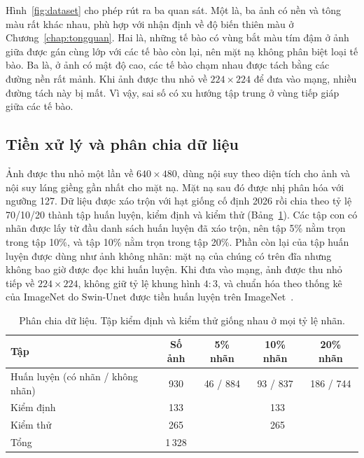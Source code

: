 Hình~\ref{fig:dataset} cho phép rút ra ba quan sát. Một là, ba ảnh có nền và tông màu rất khác nhau, phù hợp với nhận định về độ biến thiên màu ở Chương~\ref{chap:tongquan}. Hai là, những tế bào có vùng bắt màu tím đậm ở ảnh giữa được gán cùng lớp với các tế bào còn lại, nên mặt nạ không phân biệt loại tế bào. Ba là, ở ảnh có mật độ cao, các tế bào chạm nhau được tách bằng các đường nền rất mảnh. Khi ảnh được thu nhỏ về $224\times224$ để đưa vào mạng, nhiều đường tách này bị mất. Vì vậy, sai số có xu hướng tập trung ở vùng tiếp giáp giữa các tế bào.

\subsection{Tiền xử lý và phân chia dữ liệu}

Ảnh được thu nhỏ một lần về $640\times480$, dùng nội suy theo diện tích cho ảnh và nội suy láng giềng gần nhất cho mặt nạ. Mặt nạ sau đó được nhị phân hóa với ngưỡng 127. Dữ liệu được xáo trộn với hạt giống cố định 2026 rồi chia theo tỷ lệ 70/10/20 thành tập huấn luyện, kiểm định và kiểm thử (Bảng~\ref{tab:split}). Các tập con có nhãn được lấy từ đầu danh sách huấn luyện đã xáo trộn, nên tập 5\% nằm trọn trong tập 10\%, và tập 10\% nằm trọn trong tập 20\%. Phần còn lại của tập huấn luyện được dùng như ảnh không nhãn: mặt nạ của chúng có trên đĩa nhưng không bao giờ được đọc khi huấn luyện. Khi đưa vào mạng, ảnh được thu nhỏ tiếp về $224\times224$, không giữ tỷ lệ khung hình $4:3$, và chuẩn hóa theo thống kê của ImageNet do Swin-Unet được tiền huấn luyện trên ImageNet~\cite{deng2009imagenet}.

\begin{table}[ht]
\centering
\caption{Phân chia dữ liệu. Tập kiểm định và kiểm thử giống nhau ở mọi tỷ lệ nhãn.}
\label{tab:split}
\small
\begin{tabular}{lcccc}
\toprule
Tập & Số ảnh & 5\% nhãn & 10\% nhãn & 20\% nhãn \\
\midrule
Huấn luyện (có nhãn / không nhãn) & 930 & 46 / 884 & 93 / 837 & 186 / 744 \\
Kiểm định                          & 133 & \multicolumn{3}{c}{133} \\
Kiểm thử                           & 265 & \multicolumn{3}{c}{265} \\
\midrule
Tổng                               & 1\,328 & & & \\
\bottomrule
\end{tabular}
\end{table}

